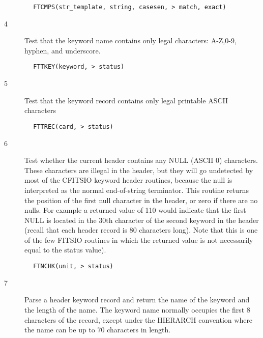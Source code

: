 \documentclass[11pt]{book}
\begin{document}
\begin{verbatim}
        FTCMPS(str_template, string, casesen, > match, exact)
\end{verbatim}


\begin{description}
\item[4 ] Test that the keyword name contains only legal characters: A-Z,0-9,
   hyphen, and underscore.
\end{description}

\begin{verbatim}
        FTTKEY(keyword, > status)
\end{verbatim}

\begin{description}
\item[5 ] Test that the keyword record contains only legal printable ASCII
     characters
\end{description}

\begin{verbatim}
        FTTREC(card, > status)
\end{verbatim}

\begin{description}
\item[6 ] Test whether the current header contains any NULL (ASCII 0) characters.
    These characters are illegal in the header, but they will go undetected
    by most of the CFITSIO keyword header routines, because the null is
    interpreted as the normal end-of-string terminator.  This routine returns
    the position of the first null character in the header, or zero if there
    are no nulls.  For example a returned value of 110 would indicate that
    the first NULL is located in the 30th character of the second keyword
    in the header (recall that each header record is 80 characters long).
    Note that this is one of the few FITSIO routines in which the returned
   value is not necessarily equal to the status value).
\end{description}

\begin{verbatim}
        FTNCHK(unit, > status)
\end{verbatim}

\begin{description}
\item[7 ] Parse a header keyword record and return the name of the keyword
    and the length of the name.
    The keyword name normally occupies the first 8 characters of the
    record, except under the HIERARCH convention where the name can
   be up to 70 characters in length.
\end{description}
\end{document}
